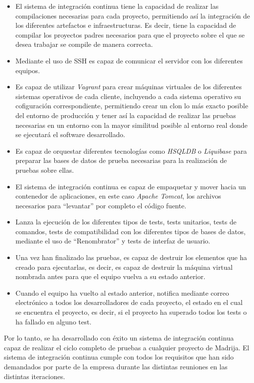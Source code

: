 \begin{itemize}
	\item El sistema de integración continua tiene la capacidad de realizar las compilaciones necesarias para cada proyecto, permitiendo así la integración de los diferentes artefactos e infraestructuras. Es decir, tiene la capacidad de compilar los proyectos padres necesarios para que el proyecto sobre el que se desea trabajar se compile de manera correcta.
	\item Mediante el uso de SSH es capaz de comunicar el servidor con los diferentes equipos.
	\item Es capaz de utilizar \textit{Vagrant} para crear máquinas virtuales de los diferentes sistemas operativos de cada cliente, incluyendo a cada sistema operativo su cofiguración correspondiente, permitiendo crear un clon lo más exacto posible del entorno de producción y tener así la capacidad de realizar las pruebas necesarias en un entorno con la mayor similitud posible al entorno real donde se ejecutará el software desarrollado.
    \item Es capaz de orquestar diferentes tecnologías como \textit{HSQLDB} o \textit{Liquibase} para preparar las bases de datos de prueba necesarias para la realización de pruebas sobre ellas.
    \item El sistema de integración continua es capaz de empaquetar y mover hacia un contenedor de aplicaciones, en este caso \textit{Apache Tomcat}, los archivos necesarios para ``levantar'' por completo el código fuente.
	\item Lanza la ejecución de los diferentes tipos de tests, tests unitarios, tests de comandos, tests de compatibilidad con los diferentes tipos de bases de datos, mediante el uso de ``Renombrator'' y tests de interfaz de usuario.
	\item Una vez han finalizado las pruebas, es capaz de destruir los elementos que ha creado para ejecutarlas, es decir, es capaz de destruir la máquina virtual nombrada antes para que el equipo vuelva a su estado anterior.
	\item Cuando el equipo ha vuelto al estado anterior, notifica mediante correo electrónico a todos los desarrolladores de cada proyecto, el estado en el cual se encuentra el proyecto, es decir, si el proyecto ha superado todos los tests o ha fallado en alguno test.
\end{itemize}

Por lo tanto, se ha desarrollado con éxito un sistema de integración continua capaz de realizar el ciclo completo de pruebas a cualquier proyecto de \ac{Madrija}. El sistema de integración continua cumple con todos los requisitos que han sido demandados por parte de la empresa durante las distintas reuniones en las distintas iteraciones.

